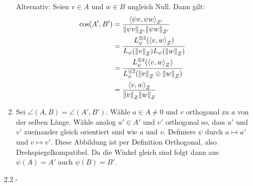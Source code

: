 \documentclass{article}
\begin{document}
\begin{enumerate}
\begin{enumerate}
			 Alternativ:
			 Seien $v \in A$ und $w \in B$ ungleich Null. Dann gilt:
			\begin{align*}
				\cos (A',B') 
				&= \frac{\scalar{\psi v}{\psi w}_{Z'}}{\norm{\psi v}_{Z'}\norm{\psi w}_{Z'}}\\
				&=
				\frac
				{L_\psi^{\tensor2}(\scalar{v}{w}_Z)}
				{L_\psi(\norm{ v}_Z)L_\psi(\norm{ w}_Z)}
				\\
				&=
				\frac
				{L_\psi^{\tensor2}(\scalar{v}{w}_Z)}
				{L^{\tensor2}_\psi(\norm{v}_Z \tensor \norm{w}_Z)}
				\\
				&=
				\frac{\scalar{v}{w}_Z}{\norm{v}_Z \norm{w}_Z}
			\end{align*}
			\item Sei $\angle(A,B) = \angle(A',B')$. Wähle $a \in A \neq 0$ und $v$ orthogonal zu $a$ von der selben Länge. Wähle analog $a' \in A'$ und $v'$ orthogonal so, dass $a'$ und $v'$ zueinander gleich orientiert sind wie $a$ und $v$. Definiere $\psi$ durch $a \mapsto a'$ und $v \mapsto v'$. Diese Abbildung ist per Definition Orthogonal, also Drehspiegelkompatibel. Da die Winkel gleich sind folgt dann aus $\psi(A) = A'$ auch $\psi(B) = B'$.
		\end{enumerate}
		\item[2.2 - \tbf{1}]
	\end{enumerate}

	\clearpage
	
\end{document}
